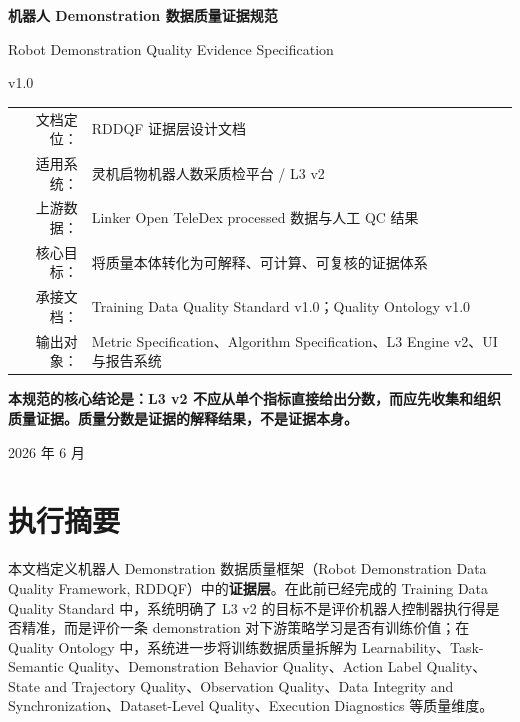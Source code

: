 \documentclass[UTF8,zihao=-4]{ctexart}
\newcommand{\Term}[1]{\textbf{#1}}
\begin{document}
\begin{titlepage}
\centering
\vspace*{2.4cm}
{\Huge\bfseries 机器人 Demonstration 数据质量证据规范\par}
\vspace{0.35cm}
{\Large Robot Demonstration Quality Evidence Specification\par}
\vspace{0.6cm}
{\LARGE v1.0\par}
\vspace{1.2cm}
\begin{tabular}{rl}
文档定位： & RDDQF 证据层设计文档 \\
适用系统： & 灵机启物机器人数采质检平台 / L3 v2 \\
上游数据： & Linker Open TeleDex processed 数据与人工 QC 结果 \\
核心目标： & 将质量本体转化为可解释、可计算、可复核的证据体系 \\
承接文档： & Training Data Quality Standard v1.0；Quality Ontology v1.0 \\
输出对象： & Metric Specification、Algorithm Specification、L3 Engine v2、UI 与报告系统 \\
\end{tabular}
\vfill
\begin{minipage}{0.86\linewidth}
\centering\large\bfseries
本规范的核心结论是：L3 v2 不应从单个指标直接给出分数，而应先收集和组织质量证据。质量分数是证据的解释结果，不是证据本身。
\end{minipage}
\vfill
{\large 2026 年 6 月\par}
\end{titlepage}

\tableofcontents
\newpage

\section*{执行摘要}

本文档定义机器人 Demonstration 数据质量框架（Robot Demonstration Data Quality Framework, RDDQF）中的\Term{证据层}。在此前已经完成的 Training Data Quality Standard 中，系统明确了 L3 v2 的目标不是评价机器人控制器执行得是否精准，而是评价一条 demonstration 对下游策略学习是否有训练价值；在 Quality Ontology 中，系统进一步将训练数据质量拆解为 Learnability、Task-Semantic Quality、Demonstration Behavior Quality、Action Label Quality、State and Trajectory Quality、Observation Quality、Data Integrity and Synchronization、Dataset-Level Quality、Execution Diagnostics 等质量维度。
\end{document}
